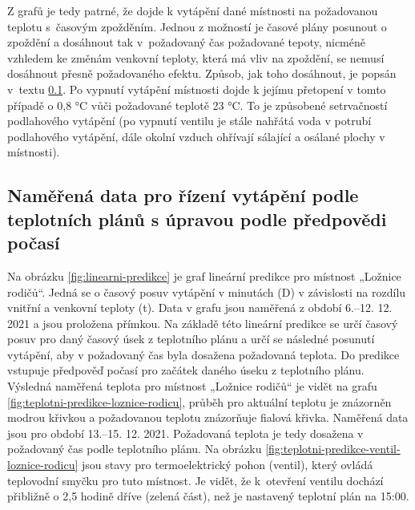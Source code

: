 Z grafů je tedy patrné, že dojde k vytápění dané místnosti na požadovanou teplotu s~časovým zpožděním. Jednou z možností je časové plány posunout o zpoždění a dosáhnout tak v~požadovaný čas požadované tepoty, nicméně vzhledem ke změnám venkovní teploty, která má vliv na zpoždění, se nemusí dosáhnout přesně požadovaného efektu. Způsob, jak toho dosáhnout, je popsán v~textu \ref{sec:namerena-data-pro-rizeni-podle-teplotnich-planu-s-upravou-predpovedi-pocasi}. Po vypnutí vytápění místnosti dojde k jejímu přetopení v tomto případě o 0,8 °C vůči požadované teplotě 23 °C. To je způsobené setrvačností podlahového vytápění (po vypnutí ventilu je stále nahřátá voda v potrubí podlahového vytápění, dále okolní vzduch ohřívají sálající a osálané plochy v místnosti).

\subsection{Naměřená data pro řízení vytápění podle teplotních plánů s úpravou podle předpovědi počasí}
\label{sec:namerena-data-pro-rizeni-podle-teplotnich-planu-s-upravou-predpovedi-pocasi}
Na obrázku \ref{fig:linearni-predikce} je graf lineární predikce pro místnost „Ložnice rodičů“. Jedná se o časový posuv vytápění v minutách (D) v závislosti na rozdílu vnitřní a venkovní teploty (t). Data v grafu jsou naměřená z období 6.–12. 12. 2021 a jsou proložena přímkou. Na základě této lineární predikce se určí časový posuv pro daný časový úsek z teplotního plánu a určí se následné posunutí vytápění, aby v požadovaný čas byla dosažena požadovaná teplota. Do predikce vstupuje předpověď počasí pro začátek daného úseku z teplotního plánu. Výsledná naměřená teplota pro místnost „Ložnice rodičů“ je vidět na grafu \ref{fig:teplotni-predikce-loznice-rodicu}, průběh pro aktuální teplotu je znázorněn modrou křivkou a požadovanou teplotu znázorňuje fialová křivka. Naměřená data jsou pro období 13.–15. 12. 2021. Požadovaná teplota je tedy dosažena v požadovaný čas podle teplotního plánu. Na obrázku \ref{fig:teplotni-predikce-ventil-loznice-rodicu} jsou stavy pro termoelektrický pohon (ventil), který ovládá teplovodní smyčku pro tuto místnost. Je vidět, že k~otevření ventilu dochází přibližně o 2,5 hodině dříve (zelená část), než je nastavený teplotní plán na 15:00.  

